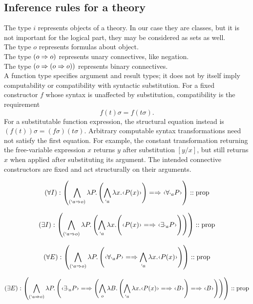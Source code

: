 
\subsection{Inference rules for a theory}
The type $i$ represents objects of a theory.
In our case they are classes, but it is not important for the logical part, they may be considered as sets as well.\\
The type $o$ represents formulas about object.\\
The type $(o \Rightarrow o)$ represents unary connectives, like negation.\\
The type $(o \Rightarrow (o \Rightarrow o))$ represents binary connectives.\\
A function type specifies argument and result types; it does not by
itself imply computability or compatibility with syntactic substitution.
For a fixed constructor $f$ whose syntax is unaffected by substitution,
compatibility is the requirement
\[
f(t)\sigma=f(t\sigma).
\]
For a substitutable function expression, the structural equation instead
is $(f(t))\sigma=(f\sigma)(t\sigma)$. Arbitrary computable syntax
transformations need not satisfy the first equation. For example, the
constant transformation returning the free-variable expression $x$
returns $y$ after substitution $[y/x]$, but still returns $x$ when
applied after substituting its argument. The intended connective
constructors are fixed and act structurally on their arguments.

\[
(\forall I):\left(
\bigwedge_{(`a\Rightarrow o)}\lambda P.
\left(\bigwedge_{`a}\lambda x.\mquoteleft P(x)\mquoteright \right)
\CIMPLIES
\mquoteleft \forall_{`a}P\mquoteright
 \right):: \prop
\]

\[
(\exists I):\left(
\bigwedge_{(`a\Rightarrow o)}\lambda P.
\left(
\bigwedge_{`a}\lambda x.
\middle(
\mquoteleft P(x)\mquoteright  \CIMPLIES \mquoteleft \exists_{`a}P\mquoteright
 \middle)
 \right)
 \right):: \prop
\]

\[
(\forall E):\left(\bigwedge_{(`a\Rightarrow o)}\lambda P.
\left(
\mquoteleft \forall_{`a}P\mquoteright
\CIMPLIES
\bigwedge_{`a}\lambda x.\mquoteleft P(x)\mquoteright
\right)
\right):: \prop
\]

\[
(\exists E):\left(
\bigwedge_{(`a\Rightarrow o)}\lambda P.\left(
\mquoteleft \exists_{`a}P\mquoteright
\CIMPLIES \left(
\bigwedge_{o}\lambda B.\left(
\bigwedge_{`a}\lambda x.
\mquoteleft P(x)\mquoteright  \CIMPLIES \mquoteleft B\mquoteright
\right)
\CIMPLIES \mquoteleft B\mquoteright
 \right)
 \right)
  \right):: \prop
\]

